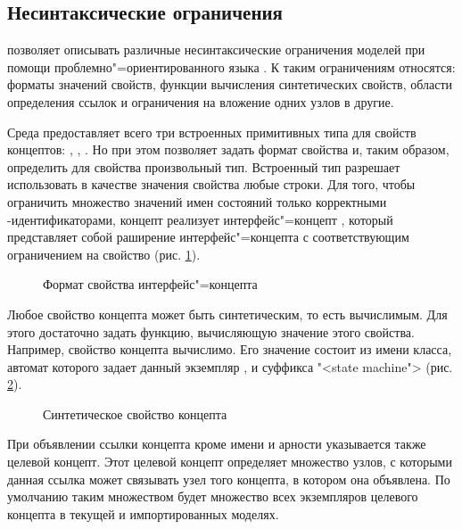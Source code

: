 \subsection{Несинтаксические ограничения}
\MPS{} позволяет описывать различные несинтаксические ограничения моделей при помощи проблемно"=ориентированного языка . К таким ограничениям относятся: форматы значений свойств, функции вычисления синтетических свойств, области определения ссылок и ограничения на вложение одних узлов в другие.

Среда \MPS{} предоставляет всего три встроенных примитивных типа для свойств концептов: , , . Но при этом позволяет задать формат свойства и, таким образом, определить для свойства произвольный тип. Встроенный тип  разрешает использовать в качестве значения свойства любые строки. Для того, чтобы ограничить множество значений имен состояний только корректными -идентификаторами, концепт  реализует интерфейс"=концепт , который представляет собой раширение интерфейс"=концепта  с соответствующим ограничением на свойство  (рис. \ref{fig:PropertyIsValid}).

\begin{figure}
 \centering
 \caption{Формат свойства  интерфейс"=концепта }
 \label{fig:PropertyIsValid}
\end{figure}

Любое свойство концепта может быть синтетическим, то есть вычислимым. Для этого достаточно задать функцию, вычисляющую значение этого свойства. Например, свойство  концепта  вычислимо. Его значение состоит из имени класса, автомат которого задает данный экземпляр , и суффикса "<state machine"> (рис. \ref{fig:PropertyGet}).

\begin{figure}
 \centering
 \caption{Синтетическое свойство  концепта }
 \label{fig:PropertyGet}
\end{figure}

При объявлении ссылки концепта кроме имени и арности указывается также целевой концепт. Этот целевой концепт определяет
множество узлов, с которыми данная ссылка может связывать узел того концепта, в котором она объявлена. По умолчанию таким
множеством будет множество всех экземпляров целевого концепта в текущей и импортированных моделях. 


